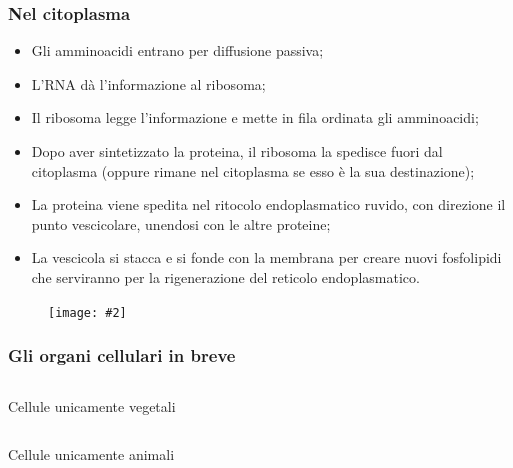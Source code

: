 \documentclass{article}
\newcommand{\cfig}[2]{
    \phantom{}
    \begin{figure}[ht!]
        \begin{center}
            \texttt{[image: \#2]}
        \end{center}
    \end{figure}
}
\begin{document}
\subsubsection{Nel citoplasma}
\begin{itemize}
    \item Gli amminoacidi entrano per diffusione passiva;
    \item L'RNA dà l'informazione al ribosoma;
    \item Il ribosoma legge l'informazione e mette in fila ordinata gli amminoacidi;
    \item Dopo aver sintetizzato la proteina, il ribosoma la spedisce fuori dal citoplasma
        (oppure rimane nel citoplasma se esso è la sua destinazione);
    \item La proteina viene spedita nel ritocolo endoplasmatico ruvido, con direzione il punto
        vescicolare, unendosi con le altre proteine;
    \item La vescicola si stacca e si fonde con la membrana per creare nuovi fosfolipidi che
        serviranno per la rigenerazione del reticolo endoplasmatico.
\end{itemize}

\cfig{.6}{media/sint-citoplasma.png}

\newpage
\subsubsection{Gli organi cellulari in breve}
\vspace*{0.5cm}
\begin{tabular}{| m{.5cm} |}
    \hline \cellcolor{darkgreen!50} \phantom{} \\ \hline
\end{tabular} Cellule unicamente vegetali

\begin{tabular}{| m{.5cm} |}
    \hline \cellcolor{blue!50} \phantom{} \\ \hline
\end{tabular} Cellule unicamente animali
\end{document}
